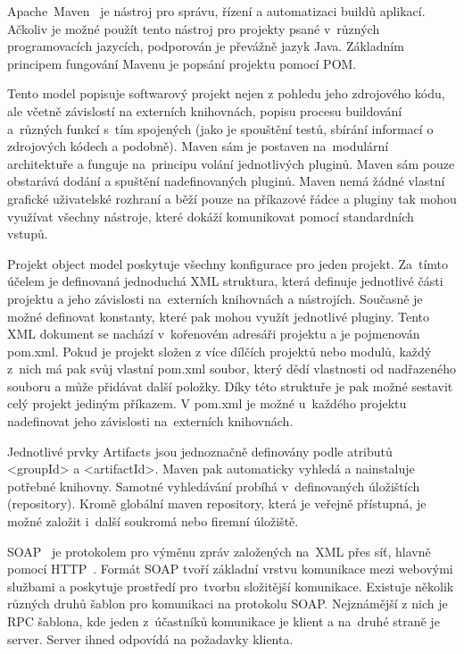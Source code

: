 Apache~Maven~\cite{apache-maven} je nástroj pro správu, řízení a automatizaci buildů aplikací. Ačkoliv je možné použít tento nástroj pro projekty psané v~různých programovacích jazycích, podporován je převážně jazyk Java. Základním principem fungování Mavenu je popsání projektu pomocí POM. 


Tento model popisuje softwarový projekt nejen z pohledu jeho zdrojového kódu, ale včetně závislostí na externích knihovnách, popisu procesu buildování a~různých funkcí s~tím spojených (jako je spouštění testů, sbírání informací o zdrojových kódech a podobně). Maven sám je postaven na~modulární architektuře a funguje na~principu volání jednotlivých pluginů. Maven sám pouze obstarává dodání a spuštění nadefinovaných pluginů. Maven nemá žádné vlastní grafické uživatelské rozhraní a běží pouze na příkazové řádce a pluginy tak mohou využívat všechny nástroje, které dokáží komunikovat pomocí standardních vstupů. 

Projekt object model poskytuje všechny konfigurace pro jeden projekt. Za~tímto účelem je definovaná jednoduchá XML struktura, která definuje jednotlivé části projektu a jeho závislosti na~externích knihovnách a nástrojích. Současně je možné definovat konstanty, které pak mohou využít jednotlivé pluginy. Tento XML dokument se nachází v~kořenovém adresáři projektu a je pojmenován pom.xml. Pokud je projekt složen z více dílčích projektů nebo modulů, každý z~nich má pak svůj vlastní pom.xml soubor, který dědí vlastnosti od nadřazeného souboru a může přidávat další položky. Díky této struktuře je pak možné sestavit celý projekt jediným příkazem. V pom.xml je možné u~každého projektu nadefinovat jeho závislosti na~externích knihovnách. 

Jednotlivé prvky Artifacts jsou jednoznačně definovány podle atributů <groupId> a <artifactId>. Maven pak automaticky vyhledá a nainstaluje potřebné knihovny. Samotné vyhledávání probíhá v~definovaných úložištích (repository). Kromě globální maven repository, která je veřejně přístupná, je možné založit i~další soukromá nebo firemní úložiště.

SOAP~\cite{soap} je protokolem pro výměnu zpráv založených na~XML přes síť, hlavně pomocí HTTP~\cite{http}. Formát SOAP tvoří základní vrstvu komunikace mezi webovými službami a poskytuje prostředí pro~tvorbu složitější komunikace. Existuje několik různých druhů šablon pro komunikaci na protokolu SOAP. Nejznámější z nich je RPC šablona, kde jeden z~účastníků komunikace je klient a na~druhé straně je server. Server ihned odpovídá na požadavky klienta.

